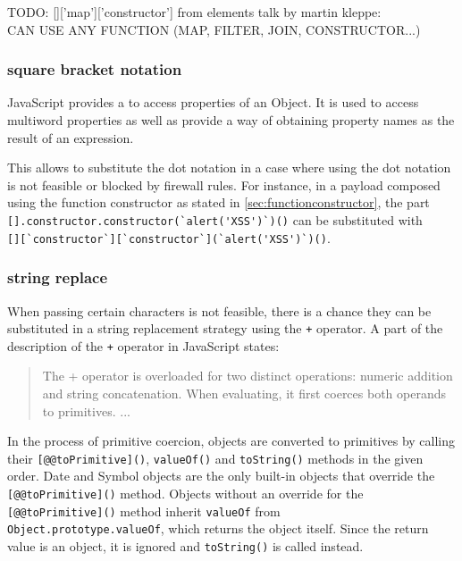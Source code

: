 {\color{red}TODO: []['map']['constructor'] from elements talk by martin kleppe:
\\ CAN USE ANY FUNCTION (MAP, FILTER, JOIN, CONSTRUCTOR...)}

\subsubsection{square bracket notation}
\label{sec:sbn}
JavaScript provides a  to access properties of an Object. It is used to access multiword properties as well as provide a way of obtaining property names as the result of an expression. \cite{js/brackets}

This  allows to substitute the dot notation in a case where using the dot notation is not feasible or blocked by firewall rules.
For instance, in a payload composed using the function constructor as stated in \ref{sec:functionconstructor}, the part \\ \verb|[].constructor.constructor(`alert('XSS')`)()| can be substituted with \\ \verb|[][`constructor`][`constructor`](`alert('XSS')`)()|.


\subsubsection{string replace}
\label{sec:stringreplace}
When passing certain characters is not feasible, there is a chance they can be substituted in a string replacement strategy using the \verb|+| operator.
A part of the description of the \verb|+| operator in JavaScript states:
\begin{quote}
	The + operator is overloaded for two distinct operations: numeric addition and string concatenation. When evaluating, it first coerces both operands to primitives. ... \cite{js/+}
\end{quote}
In the process of primitive coercion, objects are converted to primitives by calling their \verb|[@@toPrimitive]()|, \verb|valueOf()| and \verb|toString()| methods in the given order. Date and Symbol objects are the only built-in objects that override the \verb|[@@toPrimitive]()| method.
Objects without an override for the \verb|[@@toPrimitive]()| method inherit \verb|valueOf| from
\\ \verb|Object.prototype.valueOf|, which returns the object itself.
Since the return value is an object, it is ignored and \verb|toString()| is called instead. \cite{js/primitiveCoercion}

